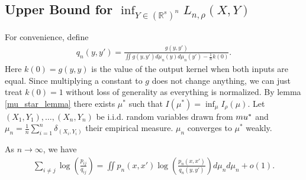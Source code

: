 \subsection{Upper Bound for \texorpdfstring{$\inf_{Y \in (\mathbb{R}^s)^n}L_{n,\rho}(X,Y)$}{L(X,Y)}}
For convenience, define
\begin{align}
    q_n(y,y') = \frac{g(y,y')}{\iint g(y,y')d \mu_n(y) d \mu_n (y') - \frac{1}{n}k(0)}.
\end{align}
Here $k(0) = g(y,y)$ is the value of the output kernel when both inputs are equal. Since multiplying a constant to $g$ does not change anything, we can just treat $k(0)=1$ without loss of generality as everything is normalized.
By lemma \ref{mu_star_lemma} there exists $\mu^*$ such that $I(\mu^*) = \inf_{\mu}I_{\rho}(\mu)$. Let $(X_1,Y_1), \dots, (X_n,Y_n)$ be i.i.d. random variables drawn from $\\mu^*$ and $\mu_n = \frac{1}{n} \sum_{i=1}^n \delta_{(X_i,Y_i)}$ their empirical measure. $\mu_n$ converges to $\mu^*$ weakly.
\begin{lemma} \label{int_approx_lemma_2}
    As $n \to \infty$, we have
    \begin{align}
        \sum_{i \neq j} \log \left(\frac{p_{ij}}{q_{ij}}\right) = \iint p_n(x,x') \log \left(\frac{p_n(x,x')}{q_n(y,y')}\right) d\mu_n d\mu_n + o(1).
    \end{align}
\end{lemma}
